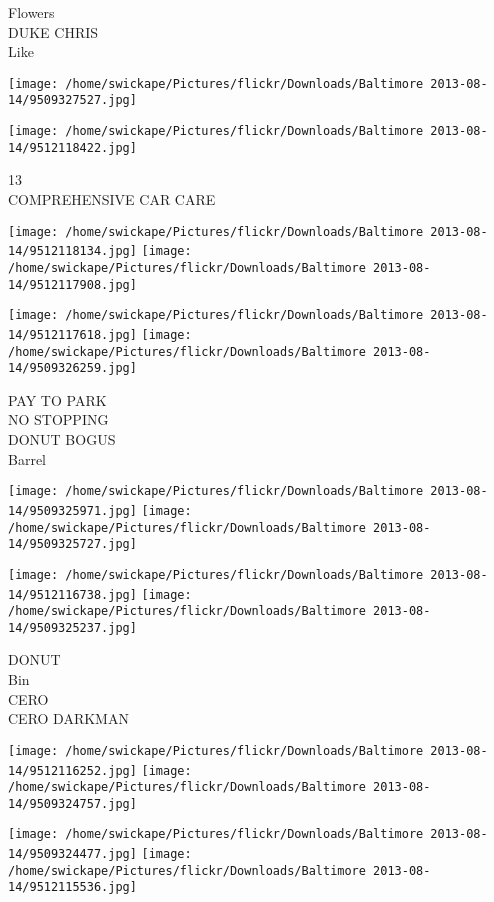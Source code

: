 \documentclass[10pt,letterpaper]{article}
\begin{document}
Flowers\\
DUKE CHRIS\\
Like\\
\pagebreak

\texttt{[image: /home/swickape/Pictures/flickr/Downloads/Baltimore 2013-08-14/9509327527.jpg]}

\vspace{0.25in}
\texttt{[image: /home/swickape/Pictures/flickr/Downloads/Baltimore 2013-08-14/9512118422.jpg]}

13\\
COMPREHENSIVE CAR CARE\\
\pagebreak

\texttt{[image: /home/swickape/Pictures/flickr/Downloads/Baltimore 2013-08-14/9512118134.jpg]}
\texttt{[image: /home/swickape/Pictures/flickr/Downloads/Baltimore 2013-08-14/9512117908.jpg]}

\texttt{[image: /home/swickape/Pictures/flickr/Downloads/Baltimore 2013-08-14/9512117618.jpg]}
\texttt{[image: /home/swickape/Pictures/flickr/Downloads/Baltimore 2013-08-14/9509326259.jpg]}

PAY TO PARK\\
NO STOPPING\\
DONUT BOGUS\\
Barrel\\
\pagebreak

\texttt{[image: /home/swickape/Pictures/flickr/Downloads/Baltimore 2013-08-14/9509325971.jpg]}
\texttt{[image: /home/swickape/Pictures/flickr/Downloads/Baltimore 2013-08-14/9509325727.jpg]}

\texttt{[image: /home/swickape/Pictures/flickr/Downloads/Baltimore 2013-08-14/9512116738.jpg]}
\texttt{[image: /home/swickape/Pictures/flickr/Downloads/Baltimore 2013-08-14/9509325237.jpg]}

DONUT\\
Bin\\
CERO\\
CERO DARKMAN\\
\pagebreak

\texttt{[image: /home/swickape/Pictures/flickr/Downloads/Baltimore 2013-08-14/9512116252.jpg]}
\texttt{[image: /home/swickape/Pictures/flickr/Downloads/Baltimore 2013-08-14/9509324757.jpg]}

\texttt{[image: /home/swickape/Pictures/flickr/Downloads/Baltimore 2013-08-14/9509324477.jpg]}
\texttt{[image: /home/swickape/Pictures/flickr/Downloads/Baltimore 2013-08-14/9512115536.jpg]}
\end{document}
